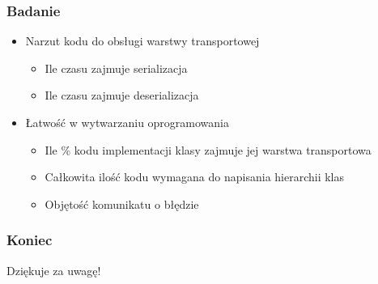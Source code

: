 \documentclass[12pt]{beamer}
\begin{document}
	\begin{frame}
		\frametitle{Badanie}

			\begin{itemize}
				\item Narzut kodu do obsługi warstwy transportowej
				\begin{itemize}
					\item Ile czasu zajmuje serializacja
					\item Ile czasu zajmuje deserializacja
				\end{itemize}
				\item Łatwość w wytwarzaniu oprogramowania
				\begin{itemize}
					\item Ile \% kodu implementacji klasy zajmuje jej warstwa transportowa
					\item Całkowita ilość kodu wymagana do napisania hierarchii klas
					\item Objętość komunikatu o błędzie
				\end{itemize}
			\end{itemize}

	\end{frame}

	\begin{frame}
		\frametitle{Koniec}

		\centering\Huge Dziękuje za uwagę!

	\end{frame}
\end{document}
